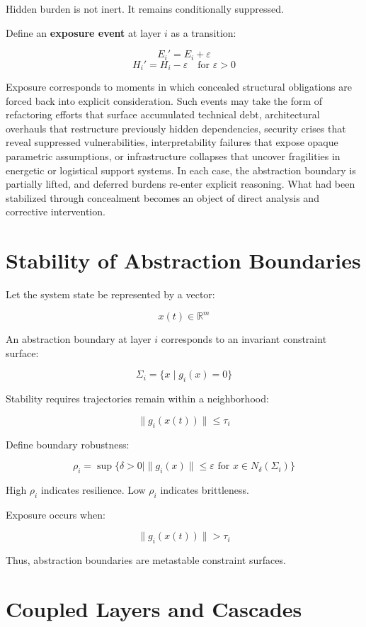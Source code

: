 \documentclass[11pt,openany]{book}
\begin{document}
Hidden burden is not inert. 
It remains conditionally suppressed.

Define an \textbf{exposure event} at layer $i$ as a transition:

\[
E_i' = E_i + \varepsilon
\]
\[
H_i' = H_i - \varepsilon
\quad \text{for } \varepsilon > 0
\]

Exposure corresponds to moments in which concealed structural obligations 
are forced back into explicit consideration. Such events may take the form 
of refactoring efforts that surface accumulated technical debt, architectural 
overhauls that restructure previously hidden dependencies, security crises 
that reveal suppressed vulnerabilities, interpretability failures that expose 
opaque parametric assumptions, or infrastructure collapses that uncover 
fragilities in energetic or logistical support systems. In each case, the 
abstraction boundary is partially lifted, and deferred burdens re-enter 
explicit reasoning. What had been stabilized through concealment becomes 
an object of direct analysis and corrective intervention.

\section{Stability of Abstraction Boundaries}

Let the system state be represented by a vector:

\[
x(t) \in \mathbb{R}^m
\]

An abstraction boundary at layer $i$ corresponds to 
an invariant constraint surface:

\[
\Sigma_i = \{x \mid g_i(x) = 0\}
\]

Stability requires trajectories remain within a neighborhood:

\[
\|g_i(x(t))\| \leq \tau_i
\]

Define boundary robustness:

\[
\rho_i = \sup \{ \delta > 0 \mid 
\|g_i(x)\| \leq \varepsilon \text{ for } x \in N_\delta(\Sigma_i) \}
\]

High $\rho_i$ indicates resilience.
Low $\rho_i$ indicates brittleness.

Exposure occurs when:

\[
\|g_i(x(t))\| > \tau_i
\]

Thus, abstraction boundaries are metastable constraint surfaces.

\section{Coupled Layers and Cascades}
\end{document}
